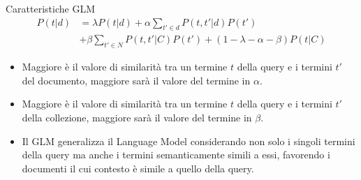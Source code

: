 \begin{frame}{Caratteristiche GLM}
    \setlength{\abovedisplayskip}{-12pt}
    \setlength{\belowdisplayskip}{-2pt}
    \[
        \begin{split}
            P(t|d) & = \lambda P(t|d) + \alpha \sum_{{t}'\in d}P(t,{t}'|d)P({t}')\\
            & + \beta \sum_{{t}'\in N}P(t,{t}'|C)P({t}') + (1-\lambda-\alpha-\beta)P(t|C)
        \end{split}
    \]
    \begin{itemize}
        \item Maggiore è il valore di similarità tra un termine \(t\) della query e i termini \({t}'\) del documento, maggiore sarà il valore del termine in \(\alpha\).
        \item Maggiore è il valore di similarità tra un termine \(t\) della query e i termini \({t}'\) della collezione, maggiore sarà il valore del termine in \(\beta\).
        \item Il GLM generalizza il Language Model considerando non solo i singoli termini della query ma anche i termini semanticamente simili a essi, favorendo i documenti il cui contesto è simile a quello della query.
    \end{itemize}
\end{frame}